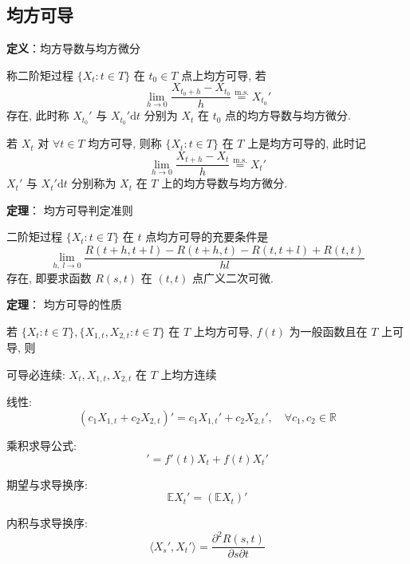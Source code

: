\documentclass[openany]{ctexbook}
\theoremstyle{kaiti}
\theoremstyle{normal}
\begin{document}
\subsection{均方可导}

\textbf{定义}：均方导数与均方微分

称二阶矩过程 $\{X_t:t\in T\}$ 在 $t_0\in T$ 点上均方可导, 若
\begin{equation}
  \lim_{h\to0}\frac{X_{t_0+h}-X_{t_0}}{h}\overset{\mathrm{m.s.}}{=}X_{t_0}'
\end{equation}
 存在, 此时称 $X_{t_0}'$ 与 $X_{t_0}'\mathrm{d}t$ 分别为 $X_t$ 在 $t_0$ 点的均方导数与均方微分.

若 $X_t$ 对 $\forall t\in T$ 均方可导, 则称 $\{X_t:t\in T\}$ 在 $T$ 上是均方可导的, 此时记
\begin{equation}
  \lim_{h\to0}\frac{X_{t+h}-X_{t}}{h}\overset{\mathrm{m.s.}}{=}X_{t}'
\end{equation}
 $X_{t}'$ 与 $X_{t}'\mathrm{d}t$ 分别称为 $X_t$ 在 $T$ 上的均方导数与均方微分.

\textbf{定理}： 均方可导判定准则

二阶矩过程 $\{X_t:t\in T\}$ 在 $t$ 点均方可导的充要条件是
\begin{equation}
  \lim_{h,~l\to0}\frac{R(t+h,t+l)-R(t+h,t)-R(t,t+l)+R(t,t)}{hl}
\end{equation}
 存在, 即要求函数 $R(s,t)$ 在 $(t,t)$ 点广义二次可微.

\textbf{定理}： 均方可导的性质

若 $\{X_t:t\in T\},\{X_{1,t},X_{2,t}:t\in T\}$ 在 $T$ 上均方可导, $f(t)$ 为一般函数且在 $T$ 上可导, 则

可导必连续: $X_t,X_{1,t},X_{2,t}$ 在 $T$ 上均方连续

线性:
\begin{equation}
  (c_1X_{1,t}+c_2X_{2,t})'=c_1X_{1,t}'+c_2X_{2,t}',\quad\forall c_1,c_2\in\mathbb{R}
\end{equation}


乘积求导公式:
\begin{equation}
  [f(t)X_t]'=f'(t)X_t+f(t)X_t'
\end{equation}


期望与求导换序:
\begin{equation}
  \mathbb{E}X_t'=(\mathbb{E}X_t)'
\end{equation}


内积与求导换序:
\begin{equation}
  \langle X_s',X_t'\rangle=\frac{\partial^2R(s,t)}{\partial s\partial t}
\end{equation}
\end{document}

